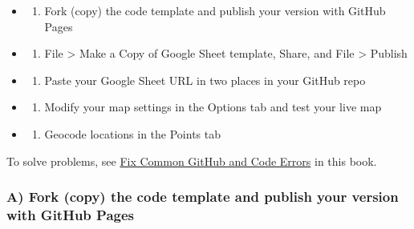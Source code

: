 \documentclass[
  english,
]{book}
\providecommand{\tightlist}{%
  \setlength{\itemsep}{0pt}\setlength{\parskip}{0pt}}
\begin{document}
\begin{itemize}
\item
  \begin{enumerate}
  \def\labelenumi{\Alph{enumi})}
  \tightlist
  \item
    Fork (copy) the code template and publish your version with GitHub Pages
  \end{enumerate}
\item
  \begin{enumerate}
  \def\labelenumi{\Alph{enumi})}
  \setcounter{enumi}{1}
  \tightlist
  \item
    File \textgreater{} Make a Copy of Google Sheet template, Share, and File \textgreater{} Publish
  \end{enumerate}
\item
  \begin{enumerate}
  \def\labelenumi{\Alph{enumi})}
  \setcounter{enumi}{2}
  \tightlist
  \item
    Paste your Google Sheet URL in two places in your GitHub repo
  \end{enumerate}
\item
  \begin{enumerate}
  \def\labelenumi{\Alph{enumi})}
  \setcounter{enumi}{3}
  \tightlist
  \item
    Modify your map settings in the Options tab and test your live map
  \end{enumerate}
\item
  \begin{enumerate}
  \def\labelenumi{\Alph{enumi})}
  \setcounter{enumi}{4}
  \tightlist
  \item
    Geocode locations in the Points tab
  \end{enumerate}
\end{itemize}

To solve problems, see \href{fix-code}{Fix Common GitHub and Code Errors} in this book.

\hypertarget{a-fork-copy-the-code-template-and-publish-your-version-with-github-pages-1}{%
\subsubsection*{A) Fork (copy) the code template and publish your version with GitHub Pages}\label{a-fork-copy-the-code-template-and-publish-your-version-with-github-pages-1}}
\end{document}
